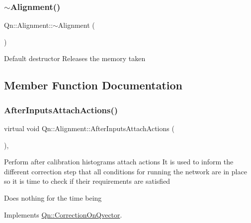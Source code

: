 \subsubsection{\texorpdfstring{$\sim$\+Alignment()}{~Alignment()}}
{\footnotesize\ttfamily Qn\+::\+Alignment\+::$\sim$\+Alignment (\begin{DoxyParamCaption}{ }\end{DoxyParamCaption})}

Default destructor Releases the memory taken 

\subsection{Member Function Documentation}
\mbox{\label{classQn_1_1Alignment_a38007827bb028b2f2e0b4a3fb988d8ed}} 
\subsubsection{\texorpdfstring{After\+Inputs\+Attach\+Actions()}{AfterInputsAttachActions()}}
{\footnotesize\ttfamily virtual void Qn\+::\+Alignment\+::\+After\+Inputs\+Attach\+Actions (\begin{DoxyParamCaption}{ }\end{DoxyParamCaption})\hspace{0.3cm}{\ttfamily [inline]}, {\ttfamily [virtual]}}

Perform after calibration histograms attach actions It is used to inform the different correction step that all conditions for running the network are in place so it is time to check if their requirements are satisfied

Does nothing for the time being 

Implements \mbox{\hyperlink{classQn_1_1CorrectionOnQvector_afa95ec7804ade8097d92002e0ea05e44}{Qn\+::\+Correction\+On\+Qvector}}.

\mbox{\label{classQn_1_1Alignment_ad9791cc06c9a7d8c407e1f783c7625f8}} 

